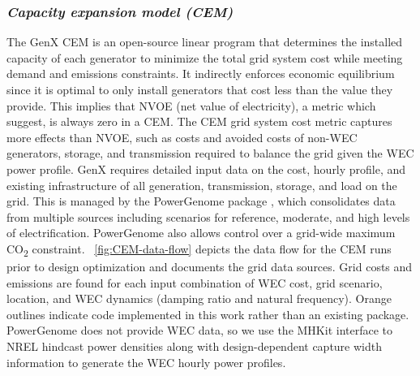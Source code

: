\documentclass[10pt,twoside]{article}
\begin{document}
\subsubsection{\textit{Capacity expansion model (CEM)}}
The GenX CEM \cite{bonaldo_genxprojectgenxjl_2025} is an open-source linear program that determines the installed capacity of each generator to minimize the total grid system cost while meeting demand and emissions constraints.
It indirectly enforces economic equilibrium since it is optimal to only install generators that cost less than the value they provide.
This implies that NVOE (net value of electricity), a metric which \cite{mowers_evaluation_2021,mccabe_system_2023} suggest, is always zero in a CEM.
The CEM grid system cost metric captures more effects than NVOE, such as costs and avoided costs of non-WEC generators, storage, and transmission required to balance the grid given the WEC power profile.
GenX requires detailed input data on the cost, hourly profile, and existing infrastructure of all generation, transmission, storage, and load on the grid.
This is managed by the PowerGenome package \cite{schivley_powergenomepowergenome_2025}, which consolidates data from multiple sources including scenarios for reference, moderate, and high levels of electrification.
PowerGenome also allows control over a grid-wide maximum CO\textsubscript{2} constraint.
\figureautorefname~\ref{fig:CEM-data-flow} depicts the data flow for the CEM runs prior to design optimization and documents the grid data sources.
Grid costs and emissions are found for each input combination of WEC cost, grid scenario, location, and WEC dynamics (damping ratio and natural frequency).
Orange outlines indicate code implemented in this work rather than an existing package.
PowerGenome does not provide WEC data, so we use the MHKit interface \cite{klise_mhkit_2020} to NREL hindcast power densities \cite{wu_development_2020,allahdadi_development_2019} along with design-dependent capture width information to generate the WEC hourly power profiles. 
\end{document}
